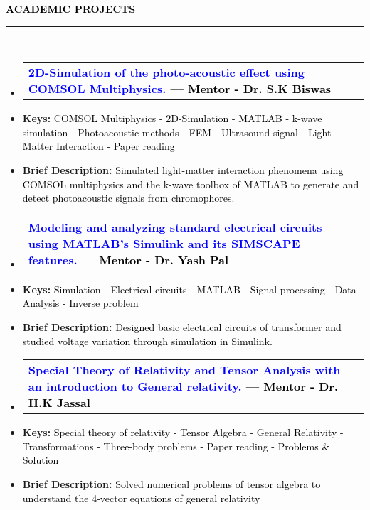 \documentclass[10pt,A4]{article}
\newcommand{\mpwidth}{\linewidth-\fboxsep-\fboxsep}
\newcommand{\cvtext}[1] {
	\begin{tabular*}{1\mpwidth}{p{0.98\mpwidth}}
		\parbox{1\mpwidth}{#1}
	\end{tabular*}
}
\newcommand{\cvsection}[1] {
	\vspace{10pt}
	    \textbf{\Large{\textcolor{black}{\uppercase{#1}}}} \\[-4pt]
		\textcolor{maincol}{ \rule{0.1\textwidth}{2pt}} \\
			
}
\newcommand{\cvproject}[5] {
\begin{itemize}
    \item [\textcolor{blue}{\faGears}]\parbox{\mpwidth}{
		\begin{tabular*}{1\mpwidth}{p{0.72\mpwidth}  r}
	 		\textcolor{blue}{\textbf{{#2} \textcolor{black}{ --- Mentor - #5}}} & \colorbox{maincol}{\makebox[0.25\mpwidth]{\textcolor{white}{#1}}}
		\end{tabular*}
	}
\end{itemize}
            \begin{itemize}
               \item [] \textbf{Keys: }\textcolor{black}{#3}
               \item [] \textbf{Brief Description: }\textcolor{black}{#4}
           \end{itemize}
           

}
\newcommand{\cvevent}[4] {
	
	\parbox{\mpwidth}{
		\begin{tabular*}{1\mpwidth}{p{0.72\mpwidth}  r}
	 		\textcolor{blue}{\textbf{#2}} & \colorbox{maincol}{\makebox[0.25\mpwidth]{\textcolor{white}{#1}}} \\
			\textcolor{maincol}{\textbf{#3}} & \\
		\end{tabular*}\\[4pt]
	
		\ifthenelse{\isempty{#4}}{}{
			\cvtext{#4}\\
		}
	}
	
}
\begin{document}
\begin{paracol}{2}
\begin{rightcolumn}






\cvsection{ACADEMIC PROJECTS}

\cvproject
	{\textbf{May 21 - Jun 21}}
	{2D-Simulation of the photo-acoustic effect using COMSOL Multiphysics.}
        {COMSOL Multiphysics - 2D-Simulation - MATLAB - k-wave simulation - Photoacoustic methods - FEM - Ultrasound signal - Light-Matter Interaction - Paper reading}
	{Simulated light-matter interaction phenomena using COMSOL multiphysics and the k-wave toolbox of MATLAB to generate and detect photoacoustic signals from chromophores.}
        {Dr. S.K Biswas}
 

\cvproject
	{\textbf{APR 20 - JUL 20}}
	{Modeling and analyzing standard electrical circuits using MATLAB’s Simulink and its SIMSCAPE features.}
        {Simulation - Electrical circuits - MATLAB - Signal processing - Data Analysis - Inverse problem}
        {Designed basic electrical circuits of transformer and studied voltage variation through simulation in Simulink.}
        {Dr. Yash Pal}

\cvproject
	{\textbf{MAY 19 - AUG 19}}
	{Special Theory of Relativity and Tensor Analysis with an introduction to General relativity.}
        {Special theory of relativity - Tensor Algebra - General Relativity - Transformations - Three-body problems - Paper reading - Problems \& Solution}
        {Solved numerical problems of tensor algebra to understand the 4-vector equations of general relativity}
        {Dr. H.K Jassal}


\end{rightcolumn}
\end{paracol}
\end{document}
